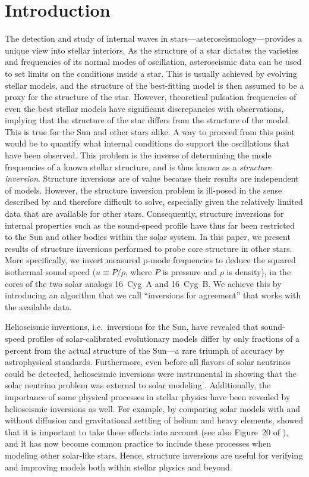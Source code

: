 \section{Introduction} 
%

The detection and study of internal waves in stars---asteroseismology---provides a unique view into stellar interiors. 
As the structure of a star dictates the varieties and frequencies of its normal modes of oscillation, asteroseismic data can be used to set limits on the conditions inside a star. 
This is usually achieved by evolving stellar models, and the structure of the best-fitting model is then assumed to be a proxy for the structure of the star. 
However, theoretical pulsation frequencies of even the best stellar models have significant discrepancies with observations, implying that the structure of the star differs from the structure of the model. 
This is true for the Sun and other stars alike. 
A way to proceed from this point would be to quantify what internal conditions do support the oscillations that have been observed. 
This problem is the inverse of determining the mode frequencies of a known stellar structure, and is thus known as a \emph{structure inversion}. 
Structure inversions are of value because their results are independent of models. 
However, the structure inversion problem is ill-posed in the sense described by \citet{hadamard} and therefore difficult to solve, especially given the relatively limited data that are available for other stars. 
Consequently, structure inversions for internal properties such as the sound-speed profile have thus far been restricted to the Sun and other bodies within the solar system. 
In this paper, we present results of structure inversions performed to probe core structure in other stars. 
More specifically, we invert measured p-mode frequencies to deduce the squared isothermal sound speed (${u\equiv P/\rho}$, where $P$ is pressure and $\rho$ is density), in the cores of the two solar analogs 16~Cyg~A and 16~Cyg~B. 
We achieve this by introducing an algorithm that we call ``inversions for agreement'' that works with the available data. 


Helioseismic inversions, i.e.~inversions for the Sun, have revealed that sound-speed profiles of solar-calibrated evolutionary models differ by only fractions of a percent from the actual structure of the Sun---a rare triumph of accuracy by astrophysical standards. 
Furthermore, even before all flavors of solar neutrinos could be detected, helioseismic inversions were instrumental in showing that the solar neutrino problem was external to solar modeling \citep[e.g.][]{1997MNRAS.289L...1A,1998PhLB..433....1B}.
Additionally, the importance of some physical processes in stellar physics have been revealed by helioseismic inversions as well. 
For example, by comparing solar models with and without diffusion and gravitational settling of helium and heavy elements, \citet{1993ApJ...403L..75C} showed that it is important to take these effects into account (see also Figure~20 of \citealt{2016lrsp...13....2b}), and it has now become common practice to include these processes when modeling other solar-like stars. 
Hence, structure inversions are useful for verifying and improving models both within stellar physics and beyond. 


